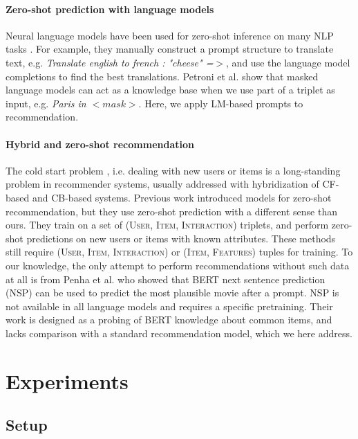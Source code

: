 \documentclass[runningheads]{llncs}
\begin{document}
\paragraph{\textbf{Zero-shot prediction with language models}} Neural language models have been used for zero-shot inference on many NLP tasks \cite{radford2019language,brown2020language}. For example, they manually construct a prompt structure to translate text, e.g. \textit{Translate english to french : "cheese" =${>}$}, and use the language model completions to find the best translations.   Petroni et al. \cite{petroni2019} show that masked language models can act as a knowledge base when we use part of a triplet as input, e.g. \textit{Paris in ${<}mask{>}$}.  Here, we apply LM-based prompts to recommendation.
\vspace{-0.15cm}

\paragraph{\textbf{Hybrid and zero-shot recommendation}}  The cold start problem \cite{Schein2002}, i.e. dealing with new users or items is a long-standing problem in recommender systems, usually addressed with hybridization of CF-based and CB-based systems.  Previous work \cite{Volkovs17,li2019zero,ding2021zeroshot,Feng21} introduced models for zero-shot recommendation, but they use zero-shot prediction with a different sense than ours. They train on a set of  {\textsc{(User, Item, Interaction)}} triplets, and perform zero-shot predictions on new users or items with known attributes.
These methods still require \textsc{(User, Item, Interaction)} or \textsc{(Item, Features)} tuples for training. To our knowledge, the only attempt to perform recommendations without such data at all is from Penha et al. \cite{Penha20} who showed that BERT \cite{devlin-etal-2019-bert} next sentence prediction (NSP) can be used to predict the most plausible movie after a prompt. NSP is not available in all language models and requires a specific pretraining. Their work is designed as a probing of BERT knowledge about common items, and lacks comparison with a standard recommendation model, which we here address.




\section{Experiments}
\subsection{Setup}
 \vspace{-0.1cm}
\end{document}
